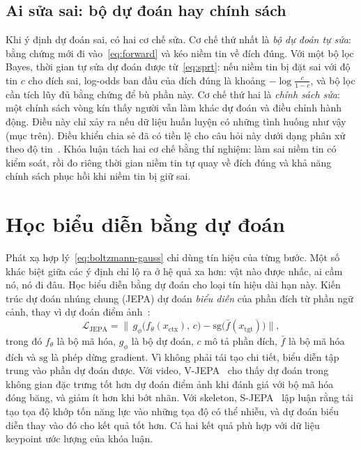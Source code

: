 \subsection{Ai sửa sai: bộ dự đoán hay chính sách}

Khi ý định dự đoán sai, có hai cơ chế sửa. Cơ chế thứ nhất là \emph{bộ dự đoán tự sửa}: bằng chứng mới đi vào~\eqref{eq:forward} và kéo niềm tin về đích đúng. Với một bộ lọc Bayes, thời gian tự sửa dự đoán được từ~\eqref{eq:sprt}: nếu niềm tin bị đặt sai với độ tin $c$ cho đích sai, log-odds ban đầu của đích đúng là khoảng $-\log\frac{c}{1-c}$, và bộ lọc cần tích lũy đủ bằng chứng để bù phần này. Cơ chế thứ hai là \emph{chính sách sửa}: một chính sách vòng kín thấy người vẫn làm khác dự đoán và điều chỉnh hành động. Điều này chỉ xảy ra nếu dữ liệu huấn luyện có những tình huống như vậy (mục trên). Điều khiển chia sẻ đã có tiền lệ cho câu hỏi này dưới dạng phân xử theo độ tin~\cite{dragan2013blending}. Khóa luận tách hai cơ chế bằng thí nghiệm: làm sai niềm tin có kiểm soát, rồi đo riêng thời gian niềm tin tự quay về đích đúng và khả năng chính sách phục hồi khi niềm tin bị giữ sai.

\section{Học biểu diễn bằng dự đoán}
\label{sec:bg-predictive}

Phát xạ hợp lý~\eqref{eq:boltzmann-gauss} chỉ dùng tín hiệu của từng bước. Một số khác biệt giữa các ý định chỉ lộ ra ở hệ quả xa hơn: vật nào được nhấc, ai cầm nó, nó đi đâu. Học biểu diễn bằng dự đoán cho loại tín hiệu dài hạn này. Kiến trúc dự đoán nhúng chung (JEPA) dự đoán \emph{biểu diễn} của phần đích từ phần ngữ cảnh, thay vì dự đoán điểm ảnh~\cite{assran2023ijepa}:
\begin{equation}
  \mathcal{L}_{\text{JEPA}}=\big\|\,g_\phi\big(f_\theta(x_{\text{ctx}}),\,c\big)-\mathrm{sg}\big(\bar f(x_{\text{tgt}})\big)\big\|,
  \label{eq:jepa}
\end{equation}
trong đó $f_\theta$ là bộ mã hóa, $g_\phi$ là bộ dự đoán, $c$ mô tả phần đích, $\bar f$ là bộ mã hóa đích và $\mathrm{sg}$ là phép dừng gradient. Vì không phải tái tạo chi tiết, biểu diễn tập trung vào phần dự đoán được. Với video, V-JEPA~\cite{bardes2024vjepa} cho thấy dự đoán trong không gian đặc trưng tốt hơn dự đoán điểm ảnh khi đánh giá với bộ mã hóa đóng băng, và giảm ít hơn khi bớt nhãn. Với skeleton, S-JEPA~\cite{abdelfattah2024sjepa} lập luận rằng tái tạo tọa độ khớp tốn năng lực vào những tọa độ có thể nhiễu, và dự đoán biểu diễn thay vào đó cho kết quả tốt hơn. Cả hai kết quả phù hợp với dữ liệu keypoint ước lượng của khóa luận.

